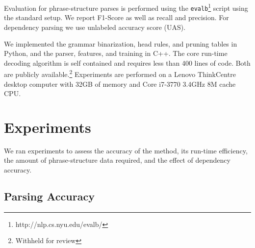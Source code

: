 \documentclass[11pt,letterpaper]{article}
\begin{document}
Evaluation for phrase-structure parses is performed using the
\texttt{evalb}\footnote{http://nlp.cs.nyu.edu/evalb/} script using the
standard setup. We report F1-Score as well as recall and
precision. For dependency parsing we use unlabeled accuracy score
(UAS).

We implemented the grammar binarization, head rules, and pruning
tables in Python, and the parser, features, and training in C++. The
core run-time decoding algorithm is self contained and requires less
than 400 lines of code. Both are publicly available.\footnote{Withheld
  for review} Experiments are performed on a Lenovo ThinkCentre desktop computer
with 32GB of memory and  Core i7-3770 3.4GHz 8M cache CPU.

\section{Experiments}
\label{sec:exper}

We ran experiments to assess the accuracy of the method, its run-time efficiency, the amount of phrase-structure data required, and the effect of dependency accuracy.
\subsection{Parsing Accuracy}
\end{document}
